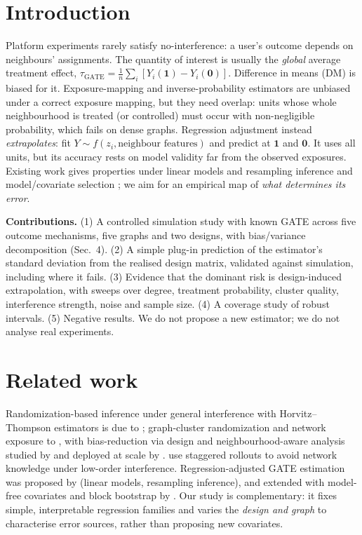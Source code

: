 \documentclass{article}
\begin{document}
\section{Introduction}
Platform experiments rarely satisfy no-interference: a user's outcome depends on neighbours' assignments. The quantity of interest is usually the \emph{global} average treatment effect, $\tau_{\mathrm{GATE}}=\frac1n\sum_i[Y_i(\mathbf 1)-Y_i(\mathbf 0)]$. Difference in means (DM) is biased for it. Exposure-mapping and inverse-probability estimators \citep{aronow2017,ugander2013} are unbiased under a correct exposure mapping, but they need overlap: units whose whole neighbourhood is treated (or controlled) must occur with non-negligible probability, which fails on dense graphs. Regression adjustment \citep{chin2019,han2023} instead \emph{extrapolates}: fit $Y\sim f(z_i,\text{neighbour features})$ and predict at $\mathbf 1$ and $\mathbf 0$. It uses all units, but its accuracy rests on model validity far from the observed exposures. Existing work gives properties under linear models and resampling inference \citep{chin2019} and model/covariate selection \citep{han2023}; we aim for an empirical map of \emph{what determines its error}.

\textbf{Contributions.} (1) A controlled simulation study with known GATE across five outcome mechanisms, five graphs and two designs, with bias/variance decomposition (Sec.~4). (2) A simple plug-in prediction of the estimator's standard deviation from the realised design matrix, validated against simulation, including where it fails. (3) Evidence that the dominant risk is design-induced extrapolation, with sweeps over degree, treatment probability, cluster quality, interference strength, noise and sample size. (4) A coverage study of robust intervals. (5) Negative results. We do not propose a new estimator; we do not analyse real experiments.

\section{Related work}
Randomization-based inference under general interference with Horvitz--Thompson estimators is due to \citet{aronow2017}; graph-cluster randomization and network exposure to \citet{ugander2013}, with bias-reduction via design and neighbourhood-aware analysis studied by \citet{eckles2017} and deployed at scale by \citet{karrer2021}. \citet{cortez2022} use staggered rollouts to avoid network knowledge under low-order interference. Regression-adjusted GATE estimation was proposed by \citet{chin2019} (linear models, resampling inference), and extended with model-free covariates and block bootstrap by \citet{han2023}. Our study is complementary: it fixes simple, interpretable regression families and varies the \emph{design and graph} to characterise error sources, rather than proposing new covariates.
\end{document}
